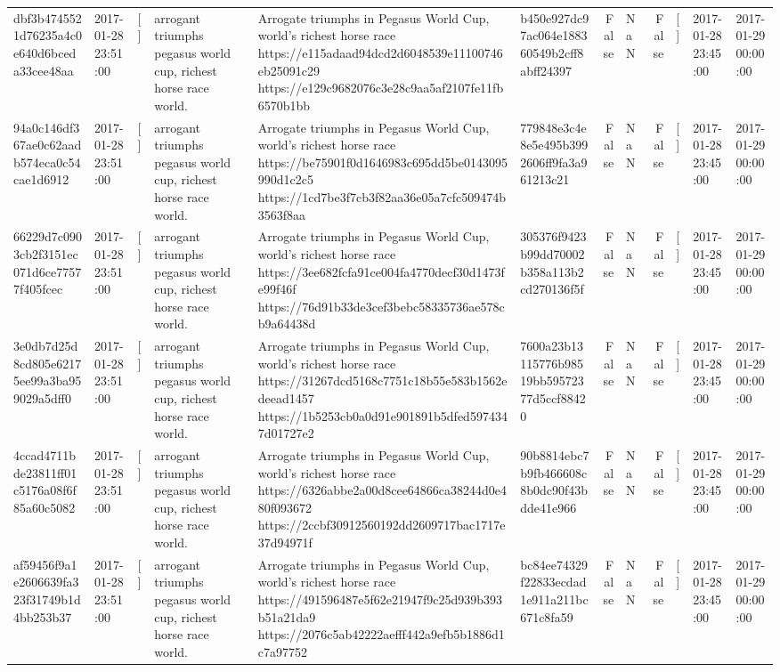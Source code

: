 \begin{tabular}{llllllrlrlll}
dbf3b4745521d76235a4c0e640d6bceda33cee48aa & 2017-01-28 23:51:00 & [] & arrogant triumphs pegasus world cup, richest horse race world. & Arrogate triumphs in Pegasus World Cup, world's richest horse race https://e115adaad94dcd2d6048539e11100746eb25091c29 https://e129c9682076c3e28c9aa5af2107fe11fb6570b1bb & b450e927dc97ac064e188360549b2cff8abff24397 & False & NaN & False & [] & 2017-01-28 23:45:00 & 2017-01-29 00:00:00 \\
94a0c146df367ae0c62aadb574eca0c54cae1d6912 & 2017-01-28 23:51:00 & [] & arrogant triumphs pegasus world cup, richest horse race world. & Arrogate triumphs in Pegasus World Cup, world's richest horse race https://be75901f0d1646983c695dd5be0143095990d1c2c5 https://1cd7be3f7cb3f82aa36e05a7cfc509474b3563f8aa & 779848e3c4e8e5e495b3992606ff9fa3a961213c21 & False & NaN & False & [] & 2017-01-28 23:45:00 & 2017-01-29 00:00:00 \\
66229d7c0903cb2f3151ec071d6ce77577f405fcec & 2017-01-28 23:51:00 & [] & arrogant triumphs pegasus world cup, richest horse race world. & Arrogate triumphs in Pegasus World Cup, world's richest horse race https://3ee682fcfa91ce004fa4770decf30d1473fe99f46f https://76d91b33de3cef3bebc58335736ae578cb9a64438d & 305376f9423b99dd70002b358a113b2cd270136f5f & False & NaN & False & [] & 2017-01-28 23:45:00 & 2017-01-29 00:00:00 \\
3e0db7d25d8cd805e62175ee99a3ba959029a5dff0 & 2017-01-28 23:51:00 & [] & arrogant triumphs pegasus world cup, richest horse race world. & Arrogate triumphs in Pegasus World Cup, world's richest horse race https://31267dcd5168c7751c18b55e583b1562edeead1457 https://1b5253cb0a0d91e901891b5dfed5974347d01727e2 & 7600a23b13115776b98519bb59572377d5ccf88420 & False & NaN & False & [] & 2017-01-28 23:45:00 & 2017-01-29 00:00:00 \\
4ccad4711bde23811ff01c5176a08f6f85a60c5082 & 2017-01-28 23:51:00 & [] & arrogant triumphs pegasus world cup, richest horse race world. & Arrogate triumphs in Pegasus World Cup, world's richest horse race https://6326abbe2a00d8cee64866ca38244d0e480f093672 https://2ccbf30912560192dd2609717bac1717e37d94971f & 90b8814ebc7b9fb466608c8b0dc90f43bdde41e966 & False & NaN & False & [] & 2017-01-28 23:45:00 & 2017-01-29 00:00:00 \\
af59456f9a1e2606639fa323f31749b1d4bb253b37 & 2017-01-28 23:51:00 & [] & arrogant triumphs pegasus world cup, richest horse race world. & Arrogate triumphs in Pegasus World Cup, world's richest horse race https://491596487e5f62e21947f9c25d939b393b51a21da9 https://2076c5ab42222aefff442a9efb5b1886d1c7a97752 & bc84ee74329f22833ecdad1e911a211bc671c8fa59 & False & NaN & False & [] & 2017-01-28 23:45:00 & 2017-01-29 00:00:00 \\

\end{tabular}
